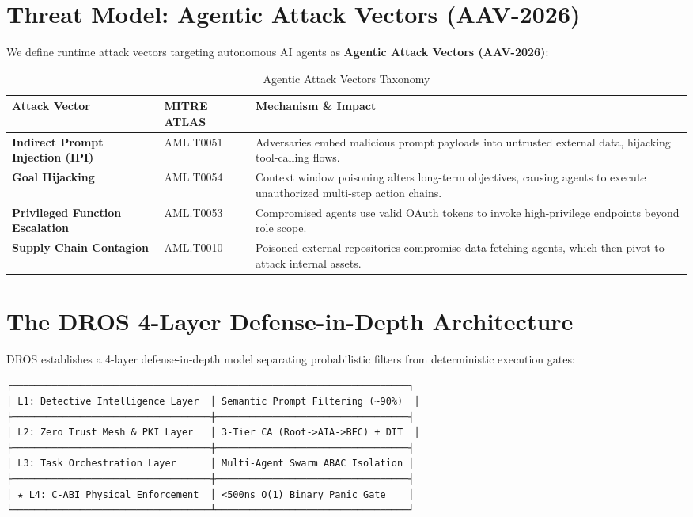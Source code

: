 \documentclass[conference]{IEEEtran}
\begin{document}
\section{Threat Model: Agentic Attack Vectors (AAV-2026)}
We define runtime attack vectors targeting autonomous AI agents as \textbf{Agentic Attack Vectors (AAV-2026)}:

\begin{table}[htbp]
\caption{Agentic Attack Vectors Taxonomy}
\begin{center}
\begin{tabular}{|p{2.2cm}|p{1.8cm}|p{3.5cm}|}
\hline
\textbf{Attack Vector} & \textbf{MITRE ATLAS} & \textbf{Mechanism \& Impact} \\ \hline
\textbf{Indirect Prompt Injection (IPI)} & AML.T0051 & Adversaries embed malicious prompt payloads into untrusted external data, hijacking tool-calling flows. \\ \hline
\textbf{Goal Hijacking} & AML.T0054 & Context window poisoning alters long-term objectives, causing agents to execute unauthorized multi-step action chains. \\ \hline
\textbf{Privileged Function Escalation} & AML.T0053 & Compromised agents use valid OAuth tokens to invoke high-privilege endpoints beyond role scope. \\ \hline
\textbf{Supply Chain Contagion} & AML.T0010 & Poisoned external repositories compromise data-fetching agents, which then pivot to attack internal assets. \\ \hline
\end{tabular}
\end{center}
\end{table}

\section{The DROS 4-Layer Defense-in-Depth Architecture}
DROS establishes a 4-layer defense-in-depth model separating probabilistic filters from deterministic execution gates:

\begin{verbatim}
┌──────────────────────────────────────────────────────────────────────┐
│ L1: Detective Intelligence Layer  │ Semantic Prompt Filtering (~90%)  │
├───────────────────────────────────┼──────────────────────────────────┤
│ L2: Zero Trust Mesh & PKI Layer   │ 3-Tier CA (Root->AIA->BEC) + DIT  │
├───────────────────────────────────┼──────────────────────────────────┤
│ L3: Task Orchestration Layer      │ Multi-Agent Swarm ABAC Isolation │
├───────────────────────────────────┼──────────────────────────────────┤
│ ★ L4: C-ABI Physical Enforcement  │ <500ns O(1) Binary Panic Gate    │
└───────────────────────────────────┴──────────────────────────────────┘
\end{verbatim}
\end{document}
